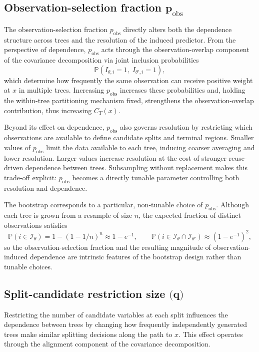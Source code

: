 \documentclass[11pt]{article}
\theoremstyle{plain}
\theoremstyle{definition}
\theoremstyle{remark}
\begin{document}
\subsection{Observation-selection fraction $\boldsymbol{p}_{\mathrm{obs}}$}
\label{subsec:obs_fraction}

The observation-selection fraction $p_{\mathrm{obs}}$ directly alters both the dependence structure across trees and the resolution of the induced predictor. From the perspective of dependence, $p_{\mathrm{obs}}$ acts through the observation-overlap component of the covariance decomposition via joint inclusion probabilities
\[
\mathbb P(I_{\theta,i}=1,\;I_{\theta',i}=1),
\]
which determine how frequently the same observation can receive positive weight at $x$ in multiple trees. Increasing $p_{\mathrm{obs}}$ increases these probabilities and, holding the within-tree partitioning mechanism fixed, strengthens the observation-overlap contribution, thus increasing $C_T(x)$.

Beyond its effect on dependence, $p_{\mathrm{obs}}$ also governs resolution by restricting which observations are available to define candidate splits and terminal regions. Smaller values of $p_{\mathrm{obs}}$ limit the data available to each tree, inducing coarser averaging and lower resolution. Larger values increase resolution at the cost of stronger reuse-driven dependence between trees. Subsampling without replacement makes this trade-off explicit: $p_{\mathrm{obs}}$ becomes a directly tunable parameter controlling both resolution and dependence.

The bootstrap corresponds to a particular, non-tunable choice of $p_{\mathrm{obs}}$. Although each tree is grown from a resample of size $n$, the expected fraction of distinct observations satisfies
\[
\mathbb P(i\in\mathcal I_\theta)=1-(1-1/n)^n \approx 1-e^{-1},
\qquad
\mathbb P(i\in\mathcal I_\theta\cap\mathcal I_{\theta'})
\approx (1-e^{-1})^2,
\]
so the observation-selection fraction and the resulting magnitude of observation-induced dependence are intrinsic features of the bootstrap design rather than tunable choices.

\subsection{Split-candidate restriction size $\boldsymbol{\mathrm(q)}$}
\label{subsec:candidate_restriction}

Restricting the number of candidate variables at each split influences the dependence between trees by changing how frequently independently generated trees make similar splitting decisions along the path to $x$. This effect operates through the alignment component of the covariance decomposition.
\end{document}
